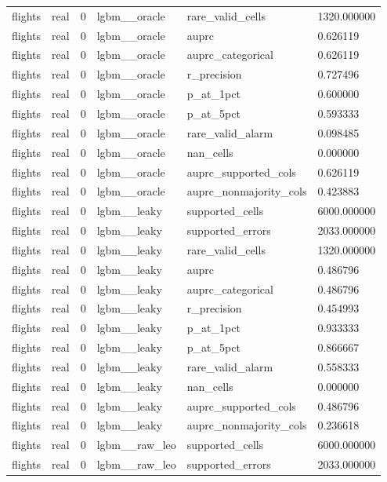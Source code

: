 \begin{tabular}{llllll}
flights & real & 0 & lgbm\_\_oracle & rare\_valid\_cells & 1320.000000 \\
flights & real & 0 & lgbm\_\_oracle & auprc & 0.626119 \\
flights & real & 0 & lgbm\_\_oracle & auprc\_categorical & 0.626119 \\
flights & real & 0 & lgbm\_\_oracle & r\_precision & 0.727496 \\
flights & real & 0 & lgbm\_\_oracle & p\_at\_1pct & 0.600000 \\
flights & real & 0 & lgbm\_\_oracle & p\_at\_5pct & 0.593333 \\
flights & real & 0 & lgbm\_\_oracle & rare\_valid\_alarm & 0.098485 \\
flights & real & 0 & lgbm\_\_oracle & nan\_cells & 0.000000 \\
flights & real & 0 & lgbm\_\_oracle & auprc\_supported\_cols & 0.626119 \\
flights & real & 0 & lgbm\_\_oracle & auprc\_nonmajority\_cols & 0.423883 \\
flights & real & 0 & lgbm\_\_leaky & supported\_cells & 6000.000000 \\
flights & real & 0 & lgbm\_\_leaky & supported\_errors & 2033.000000 \\
flights & real & 0 & lgbm\_\_leaky & rare\_valid\_cells & 1320.000000 \\
flights & real & 0 & lgbm\_\_leaky & auprc & 0.486796 \\
flights & real & 0 & lgbm\_\_leaky & auprc\_categorical & 0.486796 \\
flights & real & 0 & lgbm\_\_leaky & r\_precision & 0.454993 \\
flights & real & 0 & lgbm\_\_leaky & p\_at\_1pct & 0.933333 \\
flights & real & 0 & lgbm\_\_leaky & p\_at\_5pct & 0.866667 \\
flights & real & 0 & lgbm\_\_leaky & rare\_valid\_alarm & 0.558333 \\
flights & real & 0 & lgbm\_\_leaky & nan\_cells & 0.000000 \\
flights & real & 0 & lgbm\_\_leaky & auprc\_supported\_cols & 0.486796 \\
flights & real & 0 & lgbm\_\_leaky & auprc\_nonmajority\_cols & 0.236618 \\
flights & real & 0 & lgbm\_\_raw\_leo & supported\_cells & 6000.000000 \\
flights & real & 0 & lgbm\_\_raw\_leo & supported\_errors & 2033.000000 \\

\end{tabular}
